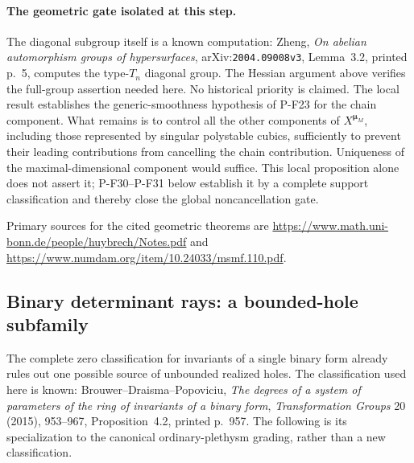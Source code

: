 \documentclass[11pt,a4paper]{article}
\begin{document}
\paragraph{The geometric gate isolated at this step.}
The diagonal subgroup itself is a known computation:
Zheng, \emph{On abelian automorphism groups of hypersurfaces},
arXiv:\texttt{2004.09008v3}, Lemma~3.2, printed p.~5,
computes the type-$T_n$ diagonal group. The Hessian argument
above verifies the full-group assertion needed here.
No historical priority is claimed. The local result establishes
the generic-smoothness hypothesis of P-F23 for the chain component.
What remains is to control all the other components of
$X^{\boldsymbol\mu_M}$, including those represented by
singular polystable cubics, sufficiently to prevent their
leading contributions from cancelling the chain contribution.
Uniqueness of the maximal-dimensional component would suffice.
This local proposition alone does not assert it; P-F30--P-F31
below establish it by a complete support classification and
thereby close the global noncancellation gate.

Primary sources for the cited geometric theorems are
\url{https://www.math.uni-bonn.de/people/huybrech/Notes.pdf}
and \url{https://www.numdam.org/item/10.24033/msmf.110.pdf}.


\subsection{Binary determinant rays: a bounded-hole subfamily}

The complete zero classification for invariants of a single binary form
already rules out one possible source of unbounded realized holes.
The classification used here is known: Brouwer--Draisma--Popoviciu,
\emph{The degrees of a system of parameters of the ring of invariants
of a binary form}, \emph{Transformation Groups} 20 (2015),
953--967, Proposition~4.2, printed p.~957. The following is its
specialization to the canonical ordinary-plethysm grading, rather
than a new classification.
\end{document}
